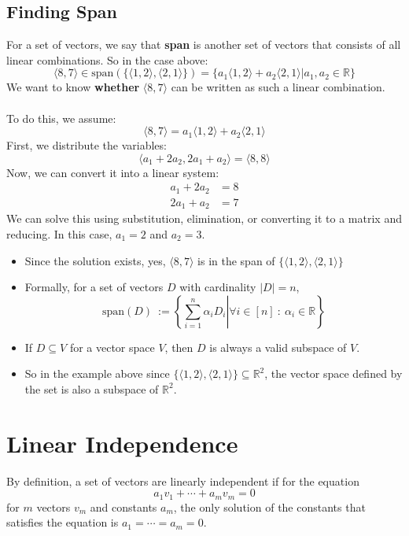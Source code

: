\documentclass[10pt]{article}
\begin{document}
\subsection*{Finding Span}
For a set of vectors, we say that \textbf{span} is another set of vectors that consists of all linear combinations.  So in the case above:
\[\langle 8, 7 \rangle \in \text{span}(\{\langle 1, 2 \rangle, \langle 2, 1 \rangle\}) = \{a_1 \langle 1, 2 \rangle + a_2 \langle 2, 1 \rangle | a_1, a_2 \in \mathbb{R}\}\]
We want to know \textbf{whether} $\langle 8, 7 \rangle$ can be written as such a linear combination.\\\\
To do this, we assume:
\[\langle 8, 7 \rangle = a_1 \langle 1, 2 \rangle + a_2 \langle 2, 1 \rangle\]
First, we distribute the variables:
\[\langle a_1 + 2a_2, 2 a_1 + a_2 \rangle = \langle 8, 8 \rangle\]
Now, we can convert it into a linear system:
\begin{align*}
    a_1 + 2a_2 &= 8 \\
    2a_1 + a_2 &= 7
\end{align*}
We can solve this using substitution, elimination, or converting it to a matrix and reducing.  In this case, $a_1 = 2$ and $a_2 = 3$.
\begin{itemize}
	\item Since the solution exists, yes, $\langle 8, 7 \rangle$ is in the span of $\{\langle 1, 2 \rangle, \langle 2, 1 \rangle\}$
	\item Formally, for a set of vectors $D$ with cardinality $|D| = n$,
	\[\text{span}(D) \::= \left\{\left.\sum_{i = 1}^n \alpha_i D_i \right\vert \forall i \in [n] \::\: \alpha_i \in \mathbb{R}\right\}\]
    \item If $D \subseteq V$ for a vector space $V$, then $D$ is always a valid subspace of $V$.
    \item So in the example above since $\{\langle 1, 2 \rangle, \langle 2, 1 \rangle\} \subseteq \mathbb{R}^2$, the vector space defined by the set is also a subspace of $\mathbb{R}^2$.
\end{itemize}

\section*{Linear Independence}
By definition, a set of vectors are linearly independent if for the equation
\[a_1 v_1 + \cdots + a_m v_m = 0\]
for $m$ vectors $v_m$ and constants $a_m$, the only solution of the constants that satisfies the equation is $a_1 = \cdots = a_m = 0$.
\end{document}
